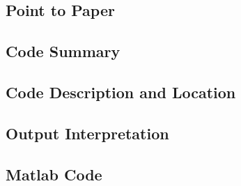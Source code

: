 \subsection{Point to Paper}

\subsection{Code Summary}

\subsection{Code Description and Location}

\subsection{Output Interpretation}

\subsection{Matlab Code}